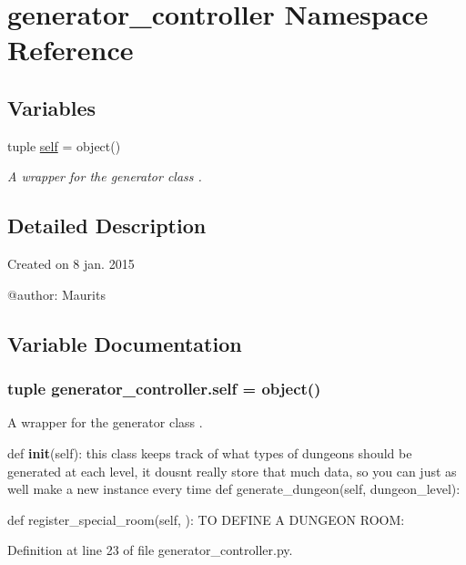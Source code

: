 \hypertarget{namespacegenerator__controller}{}\section{generator\+\_\+controller Namespace Reference}
\label{namespacegenerator__controller}
\subsection*{Variables}
\begin{DoxyCompactItemize}
\item 
tuple \hyperlink{namespacegenerator__controller_a2d9ede3206803e8f465ffe43a1cb80d6}{self} = object()
\begin{DoxyCompactList}\small\item\em A wrapper for the generator class \textquotesingle{}\textquotesingle{}\textquotesingle{}. \end{DoxyCompactList}\end{DoxyCompactItemize}


\subsection{Detailed Description}
\begin{DoxyVerb}Created on 8 jan. 2015

@author: Maurits
\end{DoxyVerb}
 

\subsection{Variable Documentation}
\hypertarget{namespacegenerator__controller_a2d9ede3206803e8f465ffe43a1cb80d6}{}
\subsubsection[{self}]{\setlength{\rightskip}{0pt plus 5cm}tuple generator\+\_\+controller.\+self = object()}\label{namespacegenerator__controller_a2d9ede3206803e8f465ffe43a1cb80d6}


A wrapper for the generator class \textquotesingle{}\textquotesingle{}\textquotesingle{}. 

def {\bfseries init}(self)\+: \textquotesingle{}\textquotesingle{}\textquotesingle{} this class keeps track of what types of dungeons should be generated at each level, it dousn\textquotesingle{}t really store that much data, so you can just as well make a new instance every time \textquotesingle{}\textquotesingle{}\textquotesingle{} def generate\+\_\+dungeon(self, dungeon\+\_\+level)\+:

def register\+\_\+special\+\_\+room(self, )\+: T\+O D\+E\+F\+I\+N\+E A D\+U\+N\+G\+E\+O\+N R\+O\+O\+M\+: 

Definition at line 23 of file generator\+\_\+controller.\+py.

